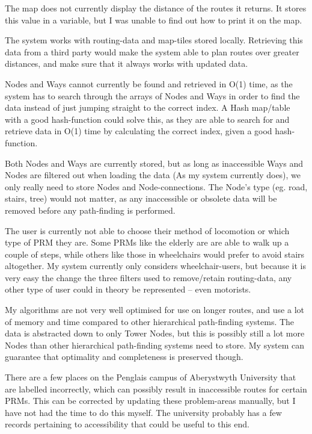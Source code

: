 The map does not currently display the distance of the routes it returns. It stores this value in a variable, but I was unable to find out how to print it on the map.

The system works with routing-data and map-tiles stored locally. Retrieving this data from a third party\cite{geofabrik,openlayers} would make the system able to plan routes over greater distances, and make sure that it always works with updated data.

Nodes and Ways cannot currently be found and retrieved in O(1) time, as the system has to search through the arrays of Nodes and Ways in order to find the data instead of just jumping straight to the correct index. A Hash map/table with a good hash-function could solve this, as they are able to search for and retrieve data in O(1) time by calculating the correct index, given a good hash-function.

Both Nodes and Ways are currently stored, but as long as inaccessible Ways and Nodes are filtered out when loading the data (As my system currently does), we only really need to store Nodes and Node-connections. The Node's type (eg. road, stairs, tree) would not matter, as any inaccessible or obsolete data will be removed before any path-finding is performed.

The user is currently not able to choose their method of locomotion or which type of PRM they are. Some PRMs like the elderly are are able to walk up a couple of steps, while others like those in wheelchairs would prefer to avoid stairs altogether. My system currently only considers wheelchair-users, but because it is very easy the change the three filters used to remove/retain routing-data, any other type of user could in theory be represented -- even motorists.

My algorithms are not very well optimised for use on longer routes, and use a lot of memory and time compared to other hierarchical path-finding systems\cite{botea-etal-jogd04,CCAI07}. The data is abstracted down to only Tower Nodes, but this is possibly still a lot more Nodes than other hierarchical path-finding systems need to store. My system can guarantee that optimality and completeness is preserved though.

There are a few places on the Penglais campus of Aberystwyth University that are labelled incorrectly, which can possibly result in inaccessible routes for certain PRMs. This can be corrected by updating these problem-areas manually, but I have not had the time to do this myself. The university probably has a few records pertaining to accessibility that could be useful to this end.

